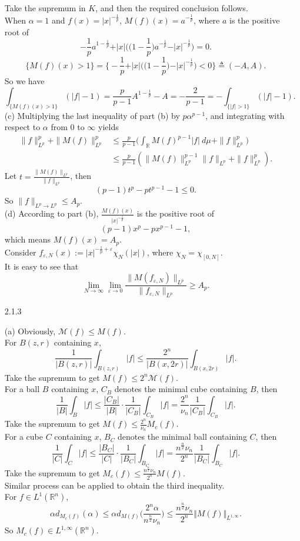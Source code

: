 \begin{itemize}
Take the supremum in $K$, and then the required conclusion follows.\\
When $\alpha=1$ and $f(x)=\vert x\vert^{-\frac1p}$, $M(f)(x)=a^{-\frac1p}$, 
where $a$ is the positive root of $$-\frac1p a^{1-\frac1p}+\vert x\vert \Big(\Big(1-\frac1p\Big)a^{-\frac1p}-\vert x\vert ^{-\frac1p}\Big)=0.$$
$$\{M(f)(x)>1\}=\Big\{\!-\frac1p+\vert x\vert \Big(\Big(1-\frac1p\Big)-\vert x\vert ^{-\frac1p}\Big)<0\Big\}\triangleq(-A,A).$$
So we have
$$\int_{\{M(f)(x)>1\}}(|f|-1)=\frac p{p-1}A^{1-\frac1p}-A
=-\frac2{p-1}=-\int_{\{|f|>1\}}(|f|-1).$$
(c) Multiplying the last inequality of part (b) by $p\alpha^{p-1}$, 
and integrating with respect to $\alpha$ from $0$ to $\infty$ yields
\begin{align*}
\|f\|_{L^p}^p+\|M(f)\|_{L^p}^p
&\leq \frac p{p-1}\bigg(\int_\mathbb{R} M(f)^{p-1}|f|\>d\mu+\|f\|_{L^p}^p\bigg)\\
&\leq \frac p{p-1}(\|M(f)\|_{L^p}^{p-1}\|f\|_{L^p}+\|f\|_{L^p}^p).
\end{align*}
Let $t=\frac{\|M(f)\|_{L^p}}{\|f\|_{L^p}}$, 
then $$(p-1)t^p-pt^{p-1}-1\leq 0.$$
So $\|f\|_{L^p\rightarrow L^p}\leq A_p.$\\
(d) According to part (b), $\frac{M(f)(x)}{|x|^{-\frac1p}}$ 
is the positive root of $$(p-1)x^p-px^{p-1}-1,$$
which means $M(f)(x)=A_p$.\\
Consider $f_{\varepsilon,N}(x):=|x|^{-\frac1p+\varepsilon}\chi_N(|x|)$, 
where $\chi_N=\chi_{[0,N]}$.\\
It is easy to see that
$$\lim_{N\rightarrow\infty}\lim_{\varepsilon\rightarrow 0}
\frac{\|M(f_{\varepsilon,N})\|_{L^p}}{\|f_{\varepsilon,N}\|_{L^p}}\geq A_p.$$

\item[2.1.3]

(a) Obviously, $\mathcal{M}(f)\leq M(f).$\\
For $B(z,r)$ containing $x$,
$$\frac{1}{\vert B(z,r)\vert }\int_{B(z,r)}\vert f\vert\leq \frac{2^n}{\vert B(x,2r)\vert }\int_{B(x,2r)}\vert f\vert.$$
Take the supremum to get $M(f)\leq2^n\mathcal{M}(f).$\\
For a ball $B$ containing $x$, $C_B$ denotes the minimal cube containing $B$, then
$$\frac{1}{\vert B\vert }\int_{B}\vert f\vert\leq \frac{\vert C_B\vert}{\vert B\vert }\cdot\frac{1}{\vert C_B\vert }\int_{C_B}\vert f\vert =\frac{2^n}{\nu_n}\frac{1}{\vert C_B\vert }\int_{C_B}\vert f\vert.$$
Take the supremum to get $M(f)\leq\frac{2^n}{\nu_n}M_c(f)$.\\
For a cube $C$ containing $x$, $B_C$ denotes the minimal ball containing $C$, then
$$\frac{1}{\vert C\vert }\int_{C}\vert f\vert\leq \frac{\vert B_C\vert}{\vert C\vert }\cdot\frac{1}{\vert B_C\vert }\int_{B_C}\vert f\vert =\frac{n^{\frac n2}\nu_n}{2^n}\frac{1}{\vert B_C\vert }\int_{B_C}\vert f\vert.$$
Take the supremum to get $M_c(f)\leq\frac{n^{\frac n2}\nu_n}{2^n}M(f)$.\\
Similar process can be applied to obtain the third inequality.\\
For $f\in L^1(\mathbb{R}^n)$,
$$\alpha d_{M_c(f)}(\alpha)\leq\alpha d_{M(f)}\bigg(\frac{2^n\alpha}{n^{\frac n2}\nu_n}\bigg)
\leq \frac{n^{\frac n2}\nu_n}{2^n}\Vert M(f)\Vert_{L^{1,\infty}}.$$
So $M_c(f)\in L^{1,\infty}(\mathbb{R}^n)$.


\end{itemize}
